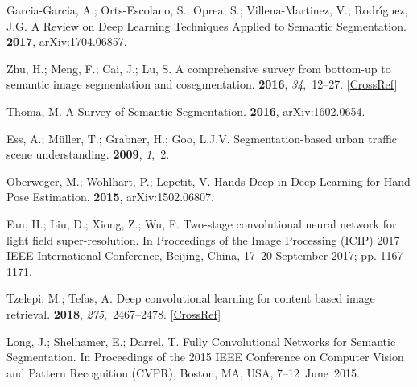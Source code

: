 \documentclass[sensors,article,accept,moreauthors,pdftex]{Definitions/mdpi}
\begin{document}
\begin{thebibliography}{999}
\providecommand{\natexlab}[1]{#1}

Garcia{-}Garcia, A.; Orts{-}Escolano, S.; Oprea, S.; Villena{-}Martinez, V.;
Rodr{\'{\i}}guez, J.G.
\newblock A Review on Deep Learning Techniques Applied to Semantic
Segmentation.
 {\bf 2017}, arXiv:1704.06857.

Zhu, H.; Meng, F.; Cai, J.; Lu, S.
\newblock A comprehensive survey from bottom-up to semantic image segmentation
and cosegmentation.
 {\bf
2016}, {\em 34},~12--27. [\href{http://dx.doi.org/10.1016/j.jvcir.2015.10.012}{CrossRef}]

Thoma, M.
\newblock A Survey of Semantic Segmentation.
 {\bf 2016}, arXiv:1602.0654.

Ess, A.; M\"{u}ller, T.; Grabner, H.; Goo, L.J.V.
\newblock Segmentation-based urban traffic scene understanding.
 {\bf 2009}, {\em 1},~2.

Oberweger, M.; Wohlhart, P.; Lepetit, V.
\newblock Hands Deep in Deep Learning for Hand Pose Estimation.
 {\bf 2015}, arXiv:1502.06807.

Fan, H.; Liu, D.; Xiong, Z.; Wu, F.
\newblock Two-stage convolutional neural network for light field
super-resolution.
\newblock In Proceedings of the Image Processing (ICIP) 2017 IEEE International Conference, Beijing, China, 17--20 September
2017; pp. 1167--1171.

Tzelepi, M.; Tefas, A.
\newblock Deep convolutional learning for content based image retrieval.
 {\bf 2018}, {\em 275},~2467--2478. [\href{http://dx.doi.org/10.1016/j.neucom.2017.11.022}{CrossRef}]

Long, J.; Shelhamer, E.; Darrel, T.
\newblock Fully Convolutional Networks for Semantic Segmentation.
\newblock In Proceedings of the  2015 IEEE Conference on Computer Vision and Pattern Recognition (CVPR), Boston, MA, USA, \mbox{7--12 June 2015.}


\end{thebibliography}
\end{document}

